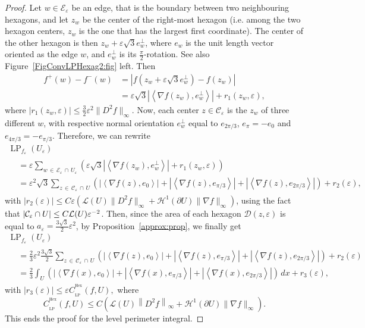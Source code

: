 \documentclass[AHL,Unicode,longabstracts,published]{cedram}
\newcommand{\eps}{\varepsilon}
\DeclareMathOperator{\LP}{LP}
\DeclareMathOperator{\Hex}{Hex}
\newcommand{\calH}{\mathcal{H}}
\newcommand{\calL}{\mathcal{L}}
\newcommand{\calC}{\mathcal{C}}
\newcommand{\calD}{\mathcal{D}}
\newcommand{\calE}{\mathcal{E}}
\begin{document}
\begin{proof}
Let $w\in\calE_\eps$ be an edge, that is the boundary between two neighbouring hexagons, and let $z_w$ be the center of the right-most hexagon (i.e. among the two hexagon centers, $z_w$ is the one that has the largest first coordinate). The center of the other hexagon is then $z_w+\eps\sqrt{3} e_w^\perp$, where $e_w$ is the unit length vector oriented as the edge $w$, and $e_w^\perp$ is its $\frac{\pi}{2}$-rotation. See also Figure~\ref{FigConvLPHexag2:fig} left. Then
\begin{align*}
f^+(w) - f^-(w) & = \left| f\left(z_w+\eps\sqrt{3} e_w^\perp\right) - f(z_w)\right|
\\
& = \eps\sqrt{3} \left|\left\langle \nabla f(z_w),e_w^\perp\right\rangle \right| + r_1(z_w,\eps),
\end{align*}
where $|r_1(z_w,\eps)|\leq \tfrac{3}{2}\eps^2 \|D^2 f\|_\infty$. Now, each center $z\in\calC_\eps$ is the $z_w$ of three different $w$, with respective normal orientation $e_w^\perp$ equal to $e_{2\pi/3}$, $e_\pi=-e_0$ and $e_{4\pi/3}=-e_{\pi/3}$. Therefore, we can rewrite
\begin{multline*}
\LP_{f_\eps}(U_\eps) \\
\begin{aligned}
& = \eps \sum_{w\,\in\,\calE_\eps\,\cap\,U_\eps} \left(
\eps\sqrt{3} \left|\left\langle \nabla f(z_w),e_w^\perp\right\rangle \right| + r_1(z_w,\eps) \right) \\
& = \eps^2 \sqrt{3} \sum_{z\,\in\,\calC_\eps\,\cap\,U} \left(\left|\left\langle \nabla f(z),e_0 \right\rangle\right| + \left|\left\langle \nabla f(z),e_{\pi/3} \right\rangle \right| +\left|\left\langle \nabla f(z),e_{2\pi/3} \right\rangle\right|\right) + r_2(\eps),
\end{aligned}
\end{multline*}
with $|r_2(\eps)|\le C\eps \left({\calL}(U) \|D^2 f\|_\infty +{\calH}^1(\partial U)\|\nabla f\|_\infty\right)$, using the fact that $|\calC_\eps\cap U|\linebreak\le C {\calL}(U)
\eps^{-2}$. Then, since the area of each hexagon $\calD(z,\eps)$ is equal to $a_\eps=\frac{3\sqrt{3}}{2}\eps^2$, by Proposition~\ref{approx:prop}, we finally get
\begin{multline*}
\LP_{f_\eps}(U_\eps)\\
\begin{aligned}
& = \frac{2}{3} \eps^2 \frac{3\sqrt{3}}{2} \sum_{z\,\in\,\calC_\eps\,\cap\,U} \left(\left|\left\langle \nabla f(z),e_0 \right\rangle \right| + \left|\left\langle \nabla f(z),e_{\pi/3} \right\rangle\right| +\left|\left\langle \nabla f(z),e_{2\pi/3} \right\rangle\right|\right) + r_2(\eps) \\
& =
\frac{2}{3} \int_U \left(\left|\left\langle
\nabla f(x),e_0\right\rangle\right| +\left|\left\langle \nabla f(x),e_{\pi/3}\right\rangle\right| +\left|\left\langle
\nabla f(x),e_{2\pi/3}\right\rangle\right| \right) \, dx + r_3(\eps),
\end{aligned}
\end{multline*}
with $|r_3(\eps)|\le \eps C_{_{\LP}}^{^{\Hex}}(f,U),$ where
\[
C_{_{\LP}}^{^{\Hex}}(f,U)\le C \left({\calL}(U) \left\|D^2 f\right\|_\infty +{\calH}^1(\partial U)\|\nabla f\|_\infty\right).
\] 
This ends the proof for the level perimeter integral.


\end{proof}
\end{document}
